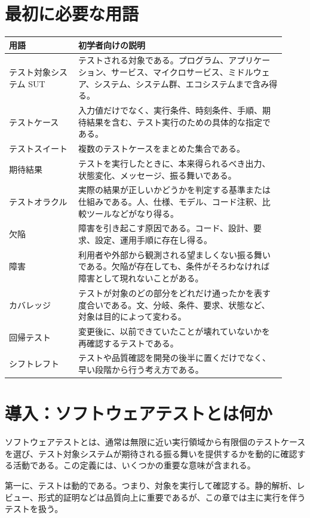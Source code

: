 \documentclass[uplatex,dvipdfmx,a4paper,11pt,nomag]{jsarticle}
\begin{document}
\section*{最初に必要な用語}
\begin{longtable}{P{0.23\linewidth}P{0.69\linewidth}}
\toprule
\textbf{用語} & \textbf{初学者向けの説明} \\
\midrule
テスト対象システム SUT & テストされる対象である。プログラム、アプリケーション、サービス、マイクロサービス、ミドルウェア、システム、システム群、エコシステムまで含み得る。\\
テストケース & 入力値だけでなく、実行条件、時刻条件、手順、期待結果を含む、テスト実行のための具体的な指定である。\\
テストスイート & 複数のテストケースをまとめた集合である。\\
期待結果 & テストを実行したときに、本来得られるべき出力、状態変化、メッセージ、振る舞いである。\\
テストオラクル & 実際の結果が正しいかどうかを判定する基準または仕組みである。人、仕様、モデル、コード注釈、比較ツールなどがなり得る。\\
欠陥 & 障害を引き起こす原因である。コード、設計、要求、設定、運用手順に存在し得る。\\
障害 & 利用者や外部から観測される望ましくない振る舞いである。欠陥が存在しても、条件がそろわなければ障害として現れないことがある。\\
カバレッジ & テストが対象のどの部分をどれだけ通ったかを表す度合いである。文、分岐、条件、要求、状態など、対象は目的によって変わる。\\
回帰テスト & 変更後に、以前できていたことが壊れていないかを再確認するテストである。\\
シフトレフト & テストや品質確認を開発の後半に置くだけでなく、早い段階から行う考え方である。\\
\bottomrule
\end{longtable}

\section*{導入：ソフトウェアテストとは何か}
ソフトウェアテストとは、通常は無限に近い実行領域から有限個のテストケースを選び、テスト対象システムが期待される振る舞いを提供するかを動的に確認する活動である。この定義には、いくつかの重要な意味が含まれる。

第一に、テストは動的である。つまり、対象を実行して確認する。静的解析、レビュー、形式的証明などは品質向上に重要であるが、この章では主に実行を伴うテストを扱う。
\end{document}

